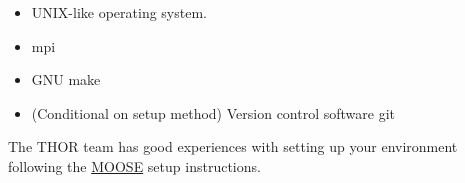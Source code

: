 \begin{itemize}
    \item UNIX-like operating system. 
    \item mpi
    \item GNU make
    \item (Conditional on setup method) Version control software git    
\end{itemize}
The THOR team has good experiences with setting up your environment following the \href{https://www.mooseframework.org/getting_started/index.html}{MOOSE} setup instructions.